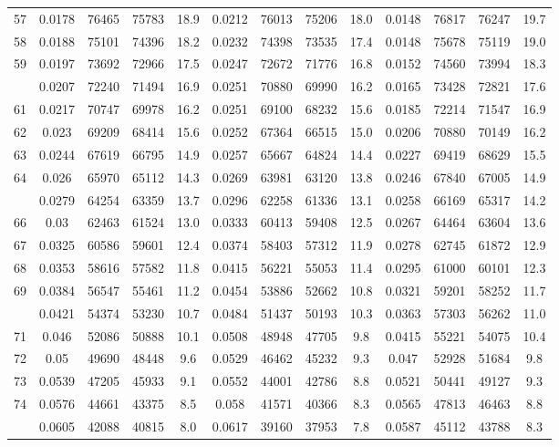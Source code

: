 \documentclass[
  14pt,
]{article}
\begin{document}
\begin{longtable}[t]{lcccccccccccc}
57 & 0.0178 & 76465 & 75783 & 18.9 & 0.0212 & 76013 & 75206 & 18.0 & 0.0148 & 76817 & 76247 & 19.7\\
58 & 0.0188 & 75101 & 74396 & 18.2 & 0.0232 & 74398 & 73535 & 17.4 & 0.0148 & 75678 & 75119 & 19.0\\
59 & 0.0197 & 73692 & 72966 & 17.5 & 0.0247 & 72672 & 71776 & 16.8 & 0.0152 & 74560 & 73994 & 18.3\\
\addlinespace
60 & 0.0207 & 72240 & 71494 & 16.9 & 0.0251 & 70880 & 69990 & 16.2 & 0.0165 & 73428 & 72821 & 17.6\\
61 & 0.0217 & 70747 & 69978 & 16.2 & 0.0251 & 69100 & 68232 & 15.6 & 0.0185 & 72214 & 71547 & 16.9\\
62 & 0.023 & 69209 & 68414 & 15.6 & 0.0252 & 67364 & 66515 & 15.0 & 0.0206 & 70880 & 70149 & 16.2\\
63 & 0.0244 & 67619 & 66795 & 14.9 & 0.0257 & 65667 & 64824 & 14.4 & 0.0227 & 69419 & 68629 & 15.5\\
64 & 0.026 & 65970 & 65112 & 14.3 & 0.0269 & 63981 & 63120 & 13.8 & 0.0246 & 67840 & 67005 & 14.9\\
\addlinespace
65 & 0.0279 & 64254 & 63359 & 13.7 & 0.0296 & 62258 & 61336 & 13.1 & 0.0258 & 66169 & 65317 & 14.2\\
66 & 0.03 & 62463 & 61524 & 13.0 & 0.0333 & 60413 & 59408 & 12.5 & 0.0267 & 64464 & 63604 & 13.6\\
67 & 0.0325 & 60586 & 59601 & 12.4 & 0.0374 & 58403 & 57312 & 11.9 & 0.0278 & 62745 & 61872 & 12.9\\
68 & 0.0353 & 58616 & 57582 & 11.8 & 0.0415 & 56221 & 55053 & 11.4 & 0.0295 & 61000 & 60101 & 12.3\\
69 & 0.0384 & 56547 & 55461 & 11.2 & 0.0454 & 53886 & 52662 & 10.8 & 0.0321 & 59201 & 58252 & 11.7\\
\addlinespace
70 & 0.0421 & 54374 & 53230 & 10.7 & 0.0484 & 51437 & 50193 & 10.3 & 0.0363 & 57303 & 56262 & 11.0\\
71 & 0.046 & 52086 & 50888 & 10.1 & 0.0508 & 48948 & 47705 & 9.8 & 0.0415 & 55221 & 54075 & 10.4\\
72 & 0.05 & 49690 & 48448 & 9.6 & 0.0529 & 46462 & 45232 & 9.3 & 0.047 & 52928 & 51684 & 9.8\\
73 & 0.0539 & 47205 & 45933 & 9.1 & 0.0552 & 44001 & 42786 & 8.8 & 0.0521 & 50441 & 49127 & 9.3\\
74 & 0.0576 & 44661 & 43375 & 8.5 & 0.058 & 41571 & 40366 & 8.3 & 0.0565 & 47813 & 46463 & 8.8\\
\addlinespace
75 & 0.0605 & 42088 & 40815 & 8.0 & 0.0617 & 39160 & 37953 & 7.8 & 0.0587 & 45112 & 43788 & 8.3\\

\end{longtable}
\end{document}
